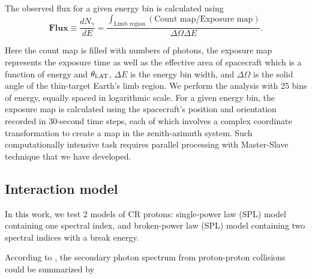 The observed flux for a given energy bin is calculated using
\begin{equation}
    \textbf{Flux} \equiv \frac{dN_\gamma}{dE} = \frac{\int_{\textrm{Limb region}}(\textrm{Count map}/\textrm{Exposure map})}{\Delta\Omega\Delta E }
    .\label{flux_definition}
\end{equation}

Here the count map is filled with numbers of photons, the exposure map represents 
the exposure time as well as the effective area of spacecraft 
which is a function of energy and $\theta_{\rm LAT}$, $\Delta E$ is the energy bin width,
and $\Delta\Omega$ is the solid angle of the thin-target Earth's limb region.
We perform the analysis with 25 bins of energy, equally spaced in logarithmic scale.
For a given energy bin, the exposure map is calculated using the spacecraft's position
and orientation recorded in 30-second time steps, each of which involves a complex
coordinate transformation to create a map in the zenith-azimuth system.
Such computationally intensive task requires parallel
processing with Master-Slave technique that we have developed.


\subsection{Interaction model}
In this work, we test 2 models of CR protons: single-power law (SPL) model
containing one spectral index, and broken-power law (SPL) model containing two
spectral indices with a break energy.

According to \cite{K&Omodel}, the secondary photon spectrum from proton-proton
collisions could be summarized by

